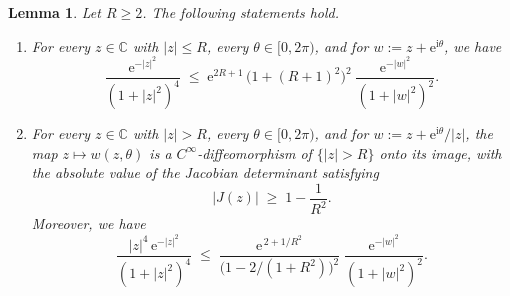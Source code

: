 \documentclass[a4paper,11pt,reqno]{amsart}
\numberwithin{equation}{section}
\theoremstyle{plain} %
\newtheorem{lemma}{Lemma}[section]
\theoremstyle{definition} %
\theoremstyle{remark}
\newcommand{\C}{\mathbb{C}}
\newcommand{\abs}[1]{\lvert #1 \rvert}
\newcommand{\ee}{\mathrm{e}}
\newcommand{\ii}{\mathrm{i}}
\begin{document}
\begin{lemma}\label{lem:weight-shift}
Let $R \ge 2$. The following statements hold.
\begin{enumerate}[\rm(i)]
\item For every $z \in \C$ with $\abs{z}\le R$, every $\theta \in
[0,2\pi)$, and for $w := z + \ee^{\ii\theta}$, we have
\begin{equation}\label{eq:weight-shift-bd}
\frac{\ee^{-\abs{z}^{2}}}{(1+\abs{z}^{2})^{4}}
\;\le\;
\ee^{2R+1}\,\bigl(1+(R+1)^{2}\bigr)^{2}\;
\frac{\ee^{-\abs{w}^{2}}}{(1+\abs{w}^{2})^{2}}.
\end{equation}
\item For every $z \in \C$ with $\abs{z} > R$, every $\theta \in
[0,2\pi)$, and for $w := z + \ee^{\ii\theta}/\abs{z}$, the map $z \mapsto
w(z,\theta)$ is a $C^{\infty}$-diffeomorphism of $\{\abs{z}>R\}$ onto
its image, with the absolute value of the Jacobian determinant satisfying
\[
\bigl\lvert J(z)\bigr\rvert \;\ge\; 1 - \frac{1}{R^{2}}.
\]
Moreover, we have
\begin{equation}\label{eq:weight-shift-out}
\frac{\abs{z}^{4}\,\ee^{-\abs{z}^{2}}}{(1+\abs{z}^{2})^{4}}
\;\le\;
\frac{\ee^{\,2 + 1/R^{2}}}{\bigl(1-2/(1+R^{2})\bigr)^{2}}\;
\frac{\ee^{-\abs{w}^{2}}}{(1+\abs{w}^{2})^{2}}.
\end{equation}
\end{enumerate}
\end{lemma}
\end{document}
